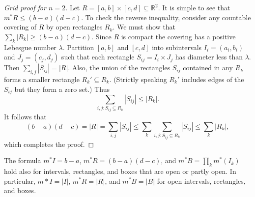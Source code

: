 \documentclass[11pt]{article}
\begin{document}
\begin{proof}[Grid proof for $n=2$]
  Let $R = [a,b] \times [c,d] \subseteq \mathbb{R}^2$.  It is simple to see that $m^* R \leqslant (b-a)(d-c)$.  To check the reverse inequality, consider any countable covering of $R$ by open rectangles $R_k$.  We must show that $\sum_k |R_k| \geqslant (b-a)(d-c)$.  Since $R$ is compact the covering has a positive Lebesgue number $\lambda$.  Partition $[a,b]$ and $[c,d]$ into subintervals $I_i = (a_i, b_i)$ and $J_j = (c_j, d_j)$ such that each rectangle $S_{ij} = I_i \times J_j$ has diameter less than $\lambda$.  Then $\sum_{i,j} |S_{ij}| = |R|$.  Also, the union of the rectangles $S_{ij}$ contained in any $R_k$ forms a smaller rectangle $R_k' \subseteq R_k$.  (Strictly speaking $R_k'$ includes edges of the $S_{ij}$ but they form a zero set.)  Thus
  \[
    \sum_{i, j: S_{ij} \subseteq R_k} |S_{ij}| \leqslant |R_k|.
  \]
  It follows that
  \[
    (b-a)(d-c) = |R| = \sum_{i,j} |S_{ij}| \leqslant \sum_k \sum_{i,j:S_{ij} \subseteq R_k} |S_{ij}| \leqslant \sum_k |R_k|,
  \]
  which completes the proof.
\end{proof}

\begin{cor}
  The formula $m^* I = b-a$, $m^* R = (b-a)(d-c)$, and $m^* B = \prod_k m^*(I_k)$ hold also for intervals, rectangles, and boxes that are open or partly open.  In particular, $m*I=|I|$, $m^*R = |R|$, and $m^*B=|B|$ for open intervals, rectangles, and boxes.
\end{cor}
\end{document}
